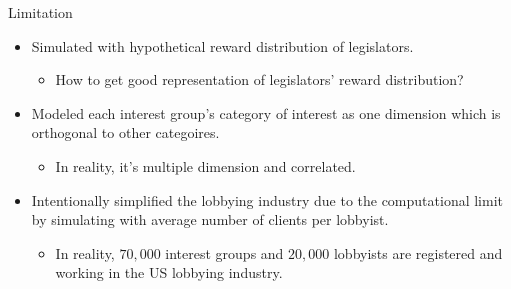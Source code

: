 \documentclass{beamer}
\begin{document}
	\begin{frame}{Limitation}	
		\begin{itemize}
			\item Simulated with hypothetical reward distribution of legislators. 
			\begin{itemize}
				\item How to get good representation of legislators' reward distribution?
			\end{itemize}
			\item Modeled each interest group's category of interest as one dimension which is orthogonal to other categoires.
			\begin{itemize}
				\item In reality, it's multiple dimension and correlated.
			\end{itemize}
			\item Intentionally simplified the lobbying industry due to the computational limit by simulating with average number of clients per lobbyist.
			\begin{itemize}
				\item In reality, $70,000$ interest groups and $20,000$ lobbyists 
				are registered and working in the US lobbying industry.  
			\end{itemize}

		\end{itemize}
	\end{frame}




\end{document}
